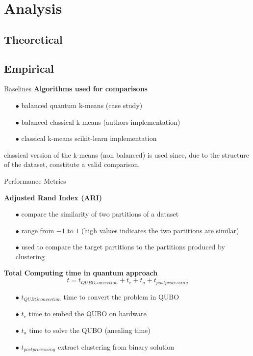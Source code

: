\section{Analysis}
	\subsection{Theoretical}
	
	\subsection{Empirical}

		\begin{frame}{Baselines}
		\textbf{Algorithms used for comparisons}
		\begin{itemize}
			\item[$\bullet$] balanced quantum k-means (case study)
			\item[$\bullet$] balanced classical k-means (authors implementation)
			\item[$\bullet$] classical k-means scikit-learn implementation
		\end{itemize}

		classical version of the k-means (non balanced) is used since, due to the structure 
		of the dataset, constitute a valid comparison.
		
		\end{frame}

		\begin{frame}{Performance Metrics}
						
			\textbf{Adjusted Rand Index (ARI)}
			\begin{itemize}
				\item[$\bullet$] compare the similarity of two partitions of a dataset
				\item[$\bullet$] range from $-1$ to $1$ (high values indicates the two partitions are similar) 
				\item[$\bullet$] used to compare the target partitions to the partitions produced by clustering 
			\end{itemize}
			
			\textbf{Total Computing time in quantum approach}
			\begin{equation}
				t = t_{QUBO_convertion} + t_{e} + t_{a} + t_{postprocessing}
			\end{equation}
			\begin{itemize}
				\item[$\bullet$] $t_{QUBO convertion}$ time to convert the problem in QUBO
				\item[$\bullet$] $t_{e}$ time to embed the QUBO on hardware 	
				\item[$\bullet$] $t_{a}$ time to solve the QUBO (anealing time)
				\item[$\bullet$] $t_{postprocessing}$ extract clustering from binary solution
			\end{itemize} 

		\end{frame}

